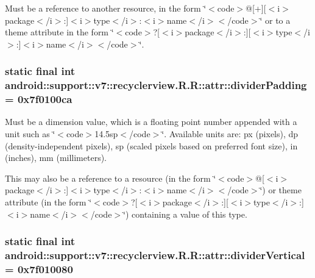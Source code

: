 Must be a reference to another resource, in the form \char`\"{}$<$code$>$@\mbox{[}+\mbox{]}\mbox{[}$<$i$>$package$<$/i$>$:\mbox{]}$<$i$>$type$<$/i$>$:$<$i$>$name$<$/i$>$$<$/code$>$\char`\"{} or to a theme attribute in the form \char`\"{}$<$code$>$?\mbox{[}$<$i$>$package$<$/i$>$:\mbox{]}\mbox{[}$<$i$>$type$<$/i$>$:\mbox{]}$<$i$>$name$<$/i$>$$<$/code$>$\char`\"{}. \hypertarget{classandroid_1_1support_1_1v7_1_1recyclerview_1_1_r_1_1attr_adf62704ce6d04a38309f814f9e65934}{
\subsubsection[{dividerPadding}]{\setlength{\rightskip}{0pt plus 5cm}static final int android::support::v7::recyclerview.R.R::attr::dividerPadding = 0x7f0100ca}}
\label{classandroid_1_1support_1_1v7_1_1recyclerview_1_1_r_1_1attr_adf62704ce6d04a38309f814f9e65934}


Must be a dimension value, which is a floating point number appended with a unit such as \char`\"{}$<$code$>$14.5sp$<$/code$>$\char`\"{}. Available units are: px (pixels), dp (density-independent pixels), sp (scaled pixels based on preferred font size), in (inches), mm (millimeters). 

This may also be a reference to a resource (in the form \char`\"{}$<$code$>$@\mbox{[}$<$i$>$package$<$/i$>$:\mbox{]}$<$i$>$type$<$/i$>$:$<$i$>$name$<$/i$>$$<$/code$>$\char`\"{}) or theme attribute (in the form \char`\"{}$<$code$>$?\mbox{[}$<$i$>$package$<$/i$>$:\mbox{]}\mbox{[}$<$i$>$type$<$/i$>$:\mbox{]}$<$i$>$name$<$/i$>$$<$/code$>$\char`\"{}) containing a value of this type. \hypertarget{classandroid_1_1support_1_1v7_1_1recyclerview_1_1_r_1_1attr_692e99bff6f06412714153e6247b8ccc}{
\subsubsection[{dividerVertical}]{\setlength{\rightskip}{0pt plus 5cm}static final int android::support::v7::recyclerview.R.R::attr::dividerVertical = 0x7f010080}}
\label{classandroid_1_1support_1_1v7_1_1recyclerview_1_1_r_1_1attr_692e99bff6f06412714153e6247b8ccc}


